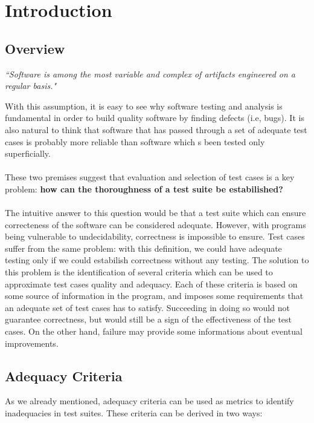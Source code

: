 \section{Introduction} \label{introduction}

\subsection{Overview}
\begin{center}
\textit{
``Software is among the most variable and complex of artifacts engineered on a 
regular basis." \cite{Pezze2008}}
\end{center}
%
With this assumption, it is easy to see why software testing and analysis 
is fundamental in order to build quality software by finding defects (i.e, bugs).
It is also natural to think that software that has passed through a set of adequate 
test cases is probably more reliable than software which s been tested only 
superficially. \\\\
%
These two premises suggest that evaluation and selection of 
test cases is a key problem: \textbf{how can the thoroughness of a test suite be 
estabilished?} \\\\
%
The intuitive answer to this question would be that a test suite which can 
ensure correcteness of the software can be considered adequate. However, with 
programs being vulnerable to undecidability, correctness is impossible to 
ensure. Test cases suffer from the same problem: with this definition, we could 
have adequate testing only if we could estabilish correctness without any 
testing. The solution to this problem is the identification of several criteria 
which can be used to approximate test cases quality and adequacy. Each of these 
criteria is based on some source of information in the program, and imposes some 
requirements that an adequate set of test cases has to satisfy. Succeeding in 
doing so would not guarantee correctness, but would still be a sign of the effectiveness 
of the test cases. On the other hand, failure may provide some informations 
about eventual improvements.

\subsection{Adequacy Criteria}
As we already mentioned, adequacy criteria can be used as metrics to identify 
inadequacies in test suites. These criteria can be derived in two ways:

